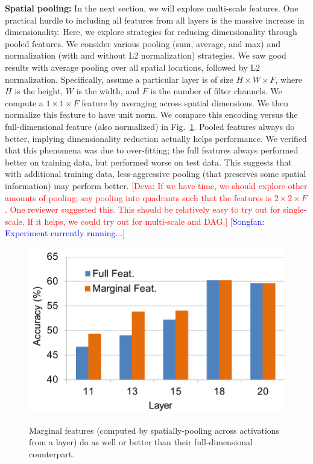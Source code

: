 \documentclass[10pt,twocolumn,letterpaper]{article}
\newcommand{\deva}[1]{\textcolor{red}{[Deva: #1]}}
\newcommand{\songfan}[1]{\textcolor{blue}{[Songfan: #1]}}
\begin{document}
{\bf Spatial pooling:} In the next section, we will explore multi-scale features. One practical hurdle to including all features from all layers is the massive increase in dimensionality. Here, we explore strategies for reducing dimensionality through pooled features. We consider various pooling (sum, average, and max) and  normalization (with and without L2 normalization) strategies. We saw good results with average pooling over all spatial locations, followed by L2 normalization. Specifically, assume a particular layer is of size $H \times W \times F$, where $H$ is the height, $W$ is the width, and $F$ is the number of filter channels. We compute a $1 \times 1 \times F$ feature by averaging across spatial dimensions. We then normalize this feature to have unit norm. %
We compare this encoding versus the full-dimensional feature (also normalized) in Fig.~\ref{fig:full_marg}. Pooled features always do better, implying dimensionality reduction actually helps performance. We verified that this phenomena was due to over-fitting; the full features always performed better on training data, but performed worse on test data. This suggests that with additional training data, less-aggressive pooling (that preserves some spatial information) may perform better. \deva{If we have time, we should explore other amounts of pooling; say pooling into quadrants such that the features is $2 \times 2 \times F$. One reviewer suggested this. This should be relatively easy to try out for single-scale. If it helps, we could try out for multi-scale and DAG.} \songfan{Experiment currently running...}

\begin{figure}[t!]
\centering
	{\includegraphics[width=.6\columnwidth]{fig/full_marg.png}}
\caption{Marginal features (computed by spatially-pooling across activations from a layer) do as well or better than their full-dimensional counterpart. }
\label{fig:full_marg}
\end{figure}
\end{document}
